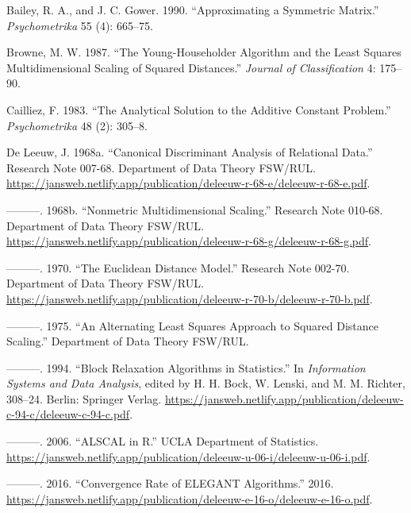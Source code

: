 \documentclass[
  12pt,
  letterpaper,
  DIV=11,
  numbers=noendperiod]{scrartcl}
\newlength{\cslhangindent}
\newenvironment{CSLReferences}[2] %
 {\begin{list}{}{%
  \setlength{\itemindent}{0pt}
  \setlength{\leftmargin}{0pt}
  \setlength{\parsep}{0pt}
  \ifodd #1
   \setlength{\leftmargin}{\cslhangindent}
   \setlength{\itemindent}{-1\cslhangindent}
  \fi
  \setlength{\itemsep}{#2\baselineskip}}}
 {\end{list}}
\begin{document}
\label{refs}
\begin{CSLReferences}{1}{0}
Bailey, R. A., and J. C. Gower. 1990. {``{Approximating a Symmetric
Matrix}.''} \emph{Psychometrika} 55 (4): 665--75.

Browne, M. W. 1987. {``{The Young-Householder Algorithm and the Least
Squares Multidimensional Scaling of Squared Distances}.''} \emph{Journal
of Classification} 4: 175--90.

Cailliez, F. 1983. {``{The Analytical Solution to the Additive Constant
Problem}.''} \emph{Psychometrika} 48 (2): 305--8.

De Leeuw, J. 1968a. {``Canonical Discriminant Analysis of Relational
Data.''} Research Note 007-68. Department of Data Theory FSW/RUL.
\url{https://jansweb.netlify.app/publication/deleeuw-r-68-e/deleeuw-r-68-e.pdf}.

---------. 1968b. {``Nonmetric Multidimensional Scaling.''} Research
Note 010-68. Department of Data Theory FSW/RUL.
\url{https://jansweb.netlify.app/publication/deleeuw-r-68-g/deleeuw-r-68-g.pdf}.

---------. 1970. {``{The Euclidean Distance Model}.''} Research Note
002-70. Department of Data Theory FSW/RUL.
\url{https://jansweb.netlify.app/publication/deleeuw-r-70-b/deleeuw-r-70-b.pdf}.

---------. 1975. {``{An Alternating Least Squares Approach to Squared
Distance Scaling}.''} Department of Data Theory FSW/RUL.

---------. 1994. {``{Block Relaxation Algorithms in Statistics}.''} In
\emph{Information Systems and Data Analysis}, edited by H. H. Bock, W.
Lenski, and M. M. Richter, 308--24. Berlin: Springer Verlag.
\url{https://jansweb.netlify.app/publication/deleeuw-c-94-c/deleeuw-c-94-c.pdf}.

---------. 2006. {``{ALSCAL in R}.''} UCLA Department of Statistics.
\url{https://jansweb.netlify.app/publication/deleeuw-u-06-i/deleeuw-u-06-i.pdf}.

---------. 2016. {``Convergence Rate of {ELEGANT} Algorithms.''} 2016.
\url{https://jansweb.netlify.app/publication/deleeuw-e-16-o/deleeuw-e-16-o.pdf}.


\end{CSLReferences}
\end{document}
